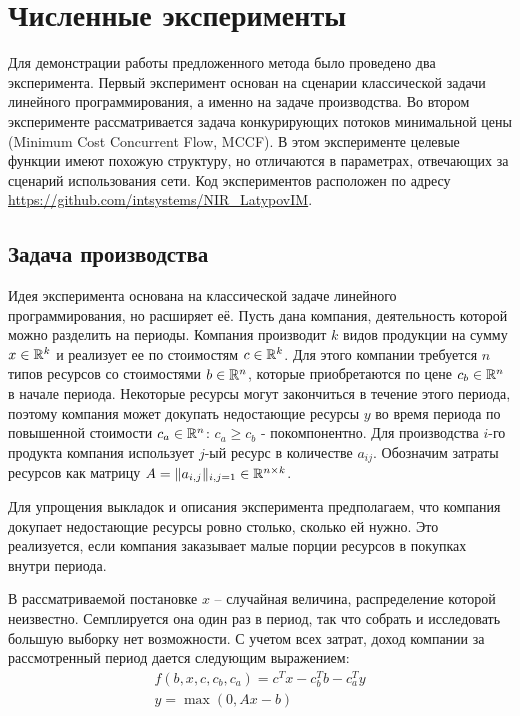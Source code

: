 
\section{Численные эксперименты}\label{sec:experiments}
    Для демонстрации работы предложенного метода было проведено два эксперимента. Первый эксперимент основан на сценарии классической задачи линейного программирования, а именно на задаче производства. Во втором эксперименте рассматривается задача конкурирующих потоков минимальной цены (Minimum Cost Concurrent Flow, MCCF). В этом эксперименте целевые функции имеют похожую структуру, но отличаются в параметрах, отвечающих за сценарий использования сети. Код экспериментов расположен по адресу \url{https://github.com/intsystems/NIR_LatypovIM}.
    
\subsection{Задача производства}\label{exp:simple}
Идея эксперимента основана на классической задаче линейного программирования, но расширяет её.  Пусть дана компания, деятельность которой можно разделить на периоды. Компания производит $k$ видов продукции на сумму $x \in {\mathbb R}^k$ и реализует ее по стоимостям $c \in {\mathbb R}^k$.  Для этого компании требуется $n$ типов ресурсов со стоимостями $b \in {\mathbb R}^n$, которые приобретаются по цене $c_b \in {\mathbb R}^n$ в начале периода. Некоторые ресурсы могут закончиться в течение этого периода, поэтому компания может докупать недостающие ресурсы $y$ во время периода по повышенной стоимости $c_a \in {\mathbb R}^n$: $c_a \ge c_b$ - покомпонентно.  Для производства $i$-го продукта компания использует $j$-ый ресурс в количестве $a_{ij}$. Обозначим затраты ресурсов как матрицу $A = \|a_{i,j}\|_{i,j = 1}\in {\mathbb R}^{n \times k}$. 

Для упрощения выкладок и описания эксперимента предполагаем, что компания докупает недостающие ресурсы ровно столько, сколько ей нужно. Это реализуется, если компания заказывает малые порции ресурсов в покупках внутри периода.

В рассматриваемой постановке $x$ -- случайная величина, распределение которой неизвестно. Семплируется она один раз в период, так что собрать и исследовать большую выборку нет возможности. С учетом всех затрат, доход компании за рассмотренный период дается следующим выражением:
\begin{align*}        
    f(b, x, c, c_b, c_a) = c^Tx - c_b^Tb - c^T_a y \\
    y = \max(0, Ax-b)
\end{align*}


